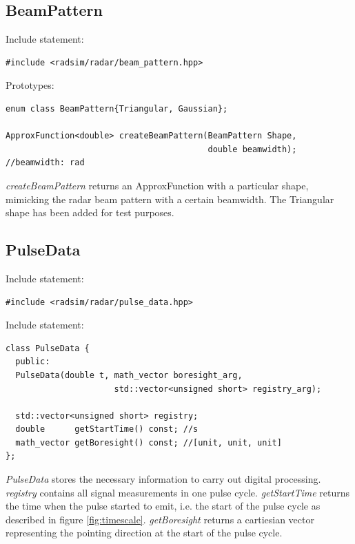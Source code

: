 \documentclass[letterpaper]{book}
\begin{document}
\subsection{BeamPattern}
Include statement:
\begin{lstlisting}
#include <radsim/radar/beam_pattern.hpp>
\end{lstlisting}
Prototypes:
\begin{lstlisting}
enum class BeamPattern{Triangular, Gaussian};

ApproxFunction<double> createBeamPattern(BeamPattern Shape, 
                                         double beamwidth);
//beamwidth: rad
\end{lstlisting}
\textit{createBeamPattern} returns an ApproxFunction with a particular shape, mimicking the radar beam pattern with a certain beamwidth. The Triangular shape has been added for test purposes. 

\subsection{PulseData}
Include statement:
\begin{lstlisting}
#include <radsim/radar/pulse_data.hpp>
\end{lstlisting}
Include statement:
\begin{lstlisting}
class PulseData {
  public:
  PulseData(double t, math_vector boresight_arg, 
                      std::vector<unsigned short> registry_arg);

  std::vector<unsigned short> registry;
  double      getStartTime() const; //s
  math_vector getBoresight() const; //[unit, unit, unit]
};
\end{lstlisting}
\textit{PulseData} stores the necessary information to carry out digital processing. \textit{registry} contains all signal measurements in one pulse cycle. \textit{getStartTime} returns the time when the pulse started to emit, i.e. the start of the pulse cycle as described in figure \ref{fig:timescale}. \textit{getBoresight} returns a cartiesian vector representing the pointing direction at the start of the pulse cycle. 
\end{document}
